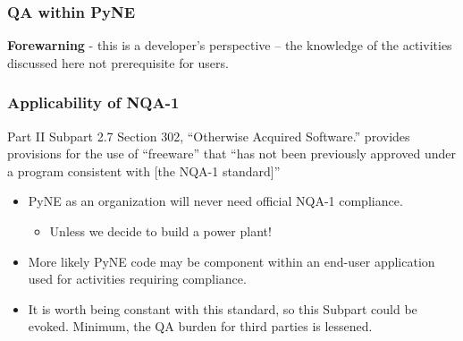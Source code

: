 \documentclass[12pt]{beamer}
\begin{document}
\begin{frame}
\frametitle{QA within PyNE}

{\bf Forewarning} - this is a developer's perspective -- the knowledge of the
activities discussed here not prerequisite for users.

\end{frame}

\begin{frame}
\frametitle{Applicability of NQA-1}

Part II Subpart 2.7 Section 302, “Otherwise Acquired Software.” provides
provisions for the use of ``freeware'' that ``has not been previously approved
under a program consistent with [the NQA-1 standard]''


\begin{itemize}
\item{PyNE as an organization will never need official NQA-1 compliance.}
    \begin{itemize}
    \item{Unless we decide to build a power plant!}
    \end{itemize}
\item{More likely PyNE code may be component within an end-user application used for activities requiring compliance.}
\item{It is worth being constant with this standard, so this Subpart could be evoked. Minimum, the QA burden for third parties is lessened.}
\end{itemize}

\end{frame}
\end{document}
